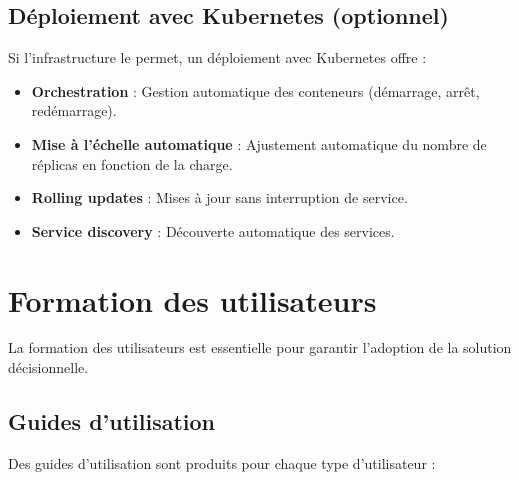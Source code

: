 \subsection{Déploiement avec Kubernetes (optionnel)}

Si l'infrastructure le permet, un déploiement avec Kubernetes offre :

\begin{itemize}
    \item \textbf{Orchestration} : Gestion automatique des conteneurs (démarrage, arrêt, redémarrage).
    \item \textbf{Mise à l'échelle automatique} : Ajustement automatique du nombre de réplicas en fonction de la charge.
    \item \textbf{Rolling updates} : Mises à jour sans interruption de service.
    \item \textbf{Service discovery} : Découverte automatique des services.
\end{itemize}

\section{Formation des utilisateurs}
\label{sec:sprint8-formation}

La formation des utilisateurs est essentielle pour garantir l'adoption de la solution décisionnelle.

\subsection{Guides d'utilisation}

Des guides d'utilisation sont produits pour chaque type d'utilisateur :

